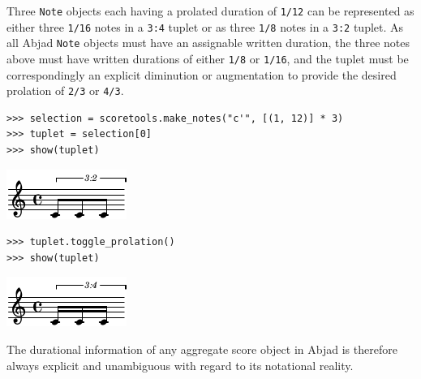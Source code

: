 Three \texttt{Note} objects each having a prolated duration of \texttt{1/12}
can be represented as either three \texttt{1/16} notes in a \texttt{3:4} tuplet
or as three \texttt{1/8} notes in a \texttt{3:2} tuplet. As all Abjad
\texttt{Note} objects must have an assignable written duration, the three notes
above must have written durations of either \texttt{1/8} or \texttt{1/16}, and
the tuplet must be correspondingly an explicit diminution or augmentation to
provide the desired prolation of \texttt{2/3} or \texttt{4/3}.

\begin{lstlisting}
>>> selection = scoretools.make_notes("c'", [(1, 12)] * 3)
>>> tuplet = selection[0]
>>> show(tuplet)
\end{lstlisting}

\includegraphics[scale=1.0]{images/section_2_notational_isomorphism-4.pdf}

\begin{lstlisting}
>>> tuplet.toggle_prolation()
>>> show(tuplet)
\end{lstlisting}

\includegraphics[scale=1.0]{images/section_2_notational_isomorphism-5.pdf}


The durational information of any aggregate score object in Abjad is therefore
always explicit and unambiguous with regard to its notational reality.